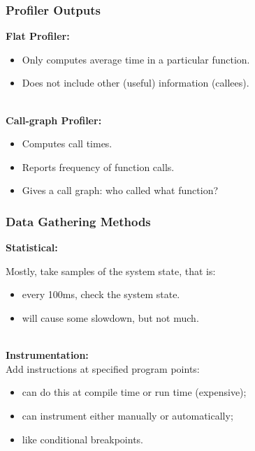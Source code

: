 \begin{frame}
  \frametitle{Profiler Outputs}


\begin{changemargin}{.5cm}
  
  {\bf Flat Profiler:}

  \begin{itemize}
    \item Only computes average time in a particular function.
    \item Does not include other (useful) information (callees).
  \end{itemize}

~\\[1em]

  {\bf Call-graph Profiler:}

  \begin{itemize}
    \item Computes call times.
    \item Reports frequency of function calls.
    \item Gives a call graph: who called what function?
  \end{itemize}
  \end{changemargin}
\end{frame}

\begin{frame}
  \frametitle{Data Gathering Methods}


\begin{changemargin}{1.5cm}
  {\bf Statistical:}

  Mostly, take samples of the system state, that is:
  \begin{itemize}
    \item every 100ms, check the system state.
    \item will cause some slowdown, but not much.
  \end{itemize}
~\\[1em]

  {\bf Instrumentation:}\\
  Add instructions at specified program points:
  \begin{itemize}
    \item can do this at compile time or run time (expensive);
    \item can instrument either manually or automatically;
    \item like conditional breakpoints.
  \end{itemize}
  \end{changemargin}
\end{frame}

